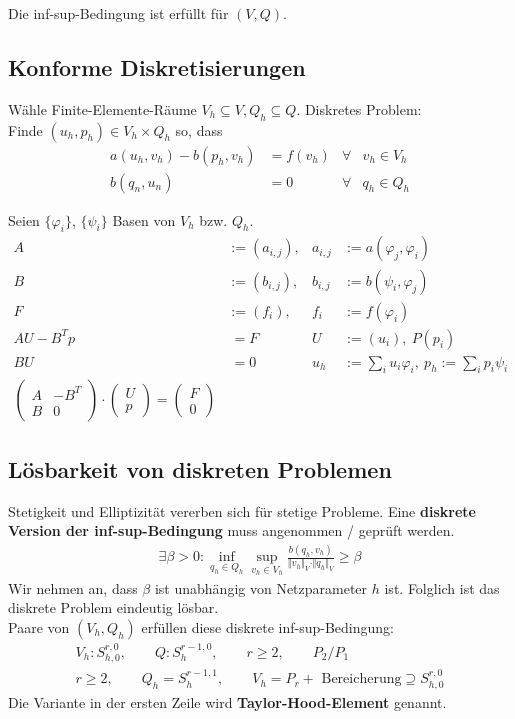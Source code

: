 Die inf-sup-Bedingung ist erfüllt für $(V,Q)$.

\subsection{Konforme Diskretisierungen} %
Wähle Finite-Elemente-Räume $V_h\subseteq V,Q_h\subseteq Q$.
Diskretes Problem:\\
Finde $(u_h,p_h)\in V_h\times Q_h$ so, dass
\begin{align*}
	a(u_h,v_h)-b(p_h,v_h)&=f(v_h) &\forall& v_h\in V_h\\
	b(q_n,u_n)&=0 &\forall& q_h\in Q_h
\end{align*}

Seien $\lbrace\varphi_i\rbrace$, $\lbrace\psi_i\rbrace$ Basen von $V_h$ bzw. $Q_h$.
\begin{align*}
	A&:=(a_{i,j}), &a_{i,j}&:=a(\varphi_j,\varphi_i)\\
	B&:=(b_{i,j}), &b_{i,j}&:=b(\psi_i,\varphi_j)\\
	F&:=(f_i), &f_i&:=f(\varphi_i)\\
	AU-B^T p&~=F &U&:=(u_i),~P(p_i)\\
	BU&~=0 &u_h&:=\sum\limits_i u_i\varphi_i,~p_h:=\sum\limits_i p_i\psi_i\\
	\begin{pmatrix}
		A & -B^T\\
		B & 0
	\end{pmatrix}\cdot\begin{pmatrix}
		U\\
		p
	\end{pmatrix}
	=\begin{pmatrix}
		F\\
		0
	\end{pmatrix}
\end{align*}

\subsection*{Lösbarkeit von diskreten Problemen}
Stetigkeit und Elliptizität vererben sich für stetige Probleme.
Eine \textbf{diskrete Version der inf-sup-Bedingung} muss angenommen / geprüft werden.
\begin{align*}
	\exists\beta>0:\inf\limits_{q_h\in Q_h}\sup\limits_{v_h\in V_h}\frac{b(q_h,v_h)}{\Vert v_h\Vert_V\cdot\Vert q_h\Vert_V}\geq\beta
\end{align*}
Wir nehmen an, dass $\beta$ ist unabhängig von Netzparameter $h$ ist.
Folglich ist das diskrete Problem eindeutig lösbar.\\
Paare von $(V_h,Q_h)$ erfüllen diese diskrete inf-sup-Bedingung:
\begin{align*}
	V_h:S_{h,0}^{r,0},\qquad Q:S_h^{r-1,0},\qquad r\geq2,\qquad P_2/P_1\\
	r\geq 2,\qquad Q_h=S_h^{r-1,1},\qquad V_h=P_r+\text{ Bereicherung}\supseteq S_{h,0}^{r,0}
\end{align*}
Die Variante in der ersten Zeile wird \textbf{Taylor-Hood-Element} genannt.

